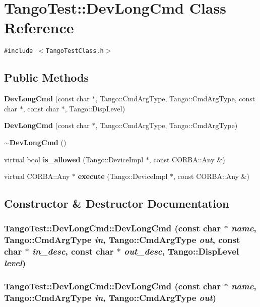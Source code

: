 \section{Tango\-Test::Dev\-Long\-Cmd  Class Reference}
\label{classTangoTest_1_1DevLongCmd}
{\tt \#include $<$Tango\-Test\-Class.h$>$}

\subsection*{Public Methods}
\begin{CompactItemize}
\item 
{\bf Dev\-Long\-Cmd} (const char $\ast$, Tango::Cmd\-Arg\-Type, Tango::Cmd\-Arg\-Type, const char $\ast$, const char $\ast$, Tango::Disp\-Level)
\item 
{\bf Dev\-Long\-Cmd} (const char $\ast$, Tango::Cmd\-Arg\-Type, Tango::Cmd\-Arg\-Type)
\item 
{\bf $\sim$Dev\-Long\-Cmd} ()
\item 
virtual bool {\bf is\_\-allowed} (Tango::Device\-Impl $\ast$, const CORBA::Any \&)
\item 
virtual CORBA::Any $\ast$ {\bf execute} (Tango::Device\-Impl $\ast$, const CORBA::Any \&)
\end{CompactItemize}


\subsection{Constructor \& Destructor Documentation}
\subsubsection{\setlength{\rightskip}{0pt plus 5cm}Tango\-Test::Dev\-Long\-Cmd::Dev\-Long\-Cmd (const char $\ast$ {\em name}, Tango::Cmd\-Arg\-Type {\em in}, Tango::Cmd\-Arg\-Type {\em out}, const char $\ast$ {\em in\_\-desc}, const char $\ast$ {\em out\_\-desc}, Tango::Disp\-Level {\em level})}\label{classTangoTest_1_1DevLongCmd_a0}


\subsubsection{\setlength{\rightskip}{0pt plus 5cm}Tango\-Test::Dev\-Long\-Cmd::Dev\-Long\-Cmd (const char $\ast$ {\em name}, Tango::Cmd\-Arg\-Type {\em in}, Tango::Cmd\-Arg\-Type {\em out})}\label{classTangoTest_1_1DevLongCmd_a1}


